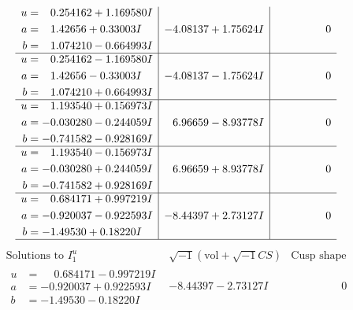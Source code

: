 \documentclass[1p]{elsarticle_modified}
\theoremstyle{definition}
\newcommand{\I}{\sqrt{-1}}
\begin{document}
$$\begin{array}{c|c|c}
\begin{aligned}
u &= \phantom{-}0.254162 + 1.169580 I \\
a &= \phantom{-}1.42656 + 0.33003 I \\
b &= \phantom{-}1.074210 - 0.664993 I\end{aligned}
 & -4.08137 + 1.75624 I & \phantom{-0.000000 } 0 \\ \hline\begin{aligned}
u &= \phantom{-}0.254162 - 1.169580 I \\
a &= \phantom{-}1.42656 - 0.33003 I \\
b &= \phantom{-}1.074210 + 0.664993 I\end{aligned}
 & -4.08137 - 1.75624 I & \phantom{-0.000000 } 0 \\ \hline\begin{aligned}
u &= \phantom{-}1.193540 + 0.156973 I \\
a &= -0.030280 - 0.244059 I \\
b &= -0.741582 - 0.928169 I\end{aligned}
 & \phantom{-}6.96659 - 8.93778 I & \phantom{-0.000000 } 0 \\ \hline\begin{aligned}
u &= \phantom{-}1.193540 - 0.156973 I \\
a &= -0.030280 + 0.244059 I \\
b &= -0.741582 + 0.928169 I\end{aligned}
 & \phantom{-}6.96659 + 8.93778 I & \phantom{-0.000000 } 0 \\ \hline\begin{aligned}
u &= \phantom{-}0.684171 + 0.997219 I \\
a &= -0.920037 - 0.922593 I \\
b &= -1.49530 + 0.18220 I\end{aligned}
 & -8.44397 + 2.73127 I & \phantom{-0.000000 } 0\\
 \hline 
 \end{array}$$\newpage$$\begin{array}{c|c|c}  
\text{Solutions to }I^u_{1}& \I (\text{vol} + \sqrt{-1}CS) & \text{Cusp shape}\\
 \hline 
\begin{aligned}
u &= \phantom{-}0.684171 - 0.997219 I \\
a &= -0.920037 + 0.922593 I \\
b &= -1.49530 - 0.18220 I\end{aligned}
 & -8.44397 - 2.73127 I & \phantom{-0.000000 } 0 \\ \hline\begin{aligned}

\end{aligned}
\end{array}$$
\end{document}

